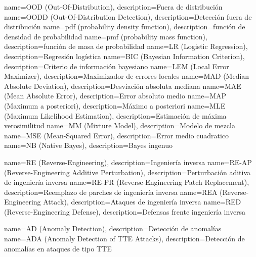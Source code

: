   {name={OOD (Out-Of-Distribution)},                  description={Fuera de distribución}}
 {name={OODD (Out-Of-Distribution Detection)},       description={Detección fuera de distribución}}
  {name={pdf (probability density function)},         description={función de densidad de probabilidad}}
  {name={pmf (probability mass function)},            description={función de masa de probabilidad}}
   {name={LR (Logistic Regression)},                   description={Regresión logística}}
  {name={BIC (Bayesian Information Criterion)},       description={Criterio de información bayesiano}}
  {name={LEM (Local Error Maximizer)},                description={Maximizador de errores locales}}
  {name={MAD (Median Absolute Deviation)},            description={Desviación absoluta mediana}}
  {name={MAE (Mean Absolute Error)},                  description={Error absoluto medio}}
  {name={MAP (Maximum a posteriori)},                 description={Máximo a posteriori}}
  {name={MLE (Maximum Likelihood Estimation)},        description={Estimación de máxima verosimilitud}}
   {name={MM (Mixture Model)},                         description={Modelo de mezcla}}
  {name={MSE (Mean-Squared Error)},                   description={Error medio cuadratico}}
   {name={NB (Native Bayes)},                          description={Bayes ingenuo}}


       {name={RE (Reverse-Engineering)},                           description={Ingeniería inversa}}
    {name={RE-AP (Reverse-Engineering Additive Perturbation)},  description={Perturbación aditiva de ingeniería inversa}}
    {name={RE-PR (Reverse-Engineering Patch Replacement)},      description={Reemplazo de parches de ingeniería inversa}}
      {name={REA (Reverse-Engineering Attack)},                   description={Ataques de ingeniería inversa}}
      {name={RED (Reverse-Engineering Defense)},                  description={Defensas frente ingeniería inversa}}


       {name={AD (Anomaly Detection)}, description={Detección de anomalías}}
  {name={ADA (Anomaly Detection of TTE Attacks)}, description={Detección de anomalías en ataques de tipo TTE}}



